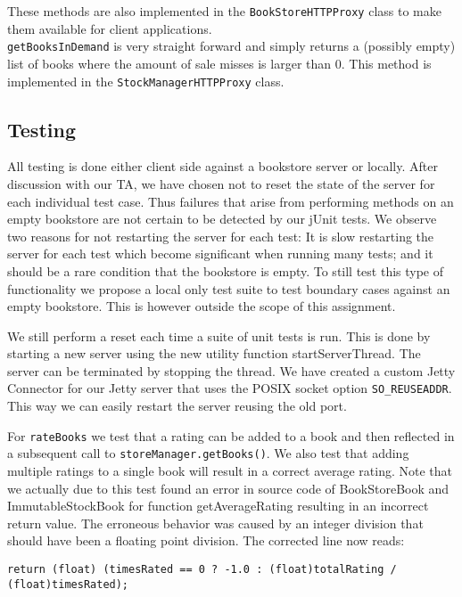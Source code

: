 \documentclass[11pt]{article}
\begin{document}
These methods are also implemented in the \texttt{BookStoreHTTPProxy} class to
make them available for client applications.\\

\texttt{getBooksInDemand} is very straight forward and simply returns a
(possibly empty) list of books where the amount of sale misses is larger than
0. This method is implemented in the \texttt{StockManagerHTTPProxy} class.

\subsection*{Testing}

All testing is done either client side against a bookstore server or locally. After discussion with our TA, we have chosen not to reset the state of the server for each individual test case. Thus failures that arise from performing methods on an empty bookstore are not certain to be detected by our jUnit tests. We observe two reasons for not restarting the server for each test: It is slow restarting the server for each test which become significant when running many tests; and it should be a rare condition that the bookstore is empty. To still test this type of functionality we propose a local only test suite to test boundary cases against an empty bookstore. This is however outside the scope of this assignment.

We still perform a reset each time a suite of unit tests is run. This is done by starting a new server using the new utility function startServerThread. The server can be terminated by stopping the thread. We have created a custom Jetty Connector for our Jetty server that uses the POSIX socket option \texttt{SO\_REUSEADDR}. This way we can easily restart the server reusing the old port.

For \texttt{rateBooks} we test that a rating can be added to a book and then reflected in a subsequent call to \texttt{storeManager.getBooks()}. We also test that adding multiple ratings to a single book will result in a correct average rating. Note that we actually due to this test found an error in source code of BookStoreBook and ImmutableStockBook for function getAverageRating resulting in an incorrect return value. The erroneous behavior was caused by an integer division that should have been a floating point division. The corrected line now reads:

\begin{center}
\texttt{return (float) (timesRated == 0 ? -1.0 : (float)totalRating / (float)timesRated);}
\end{center}
\end{document}
